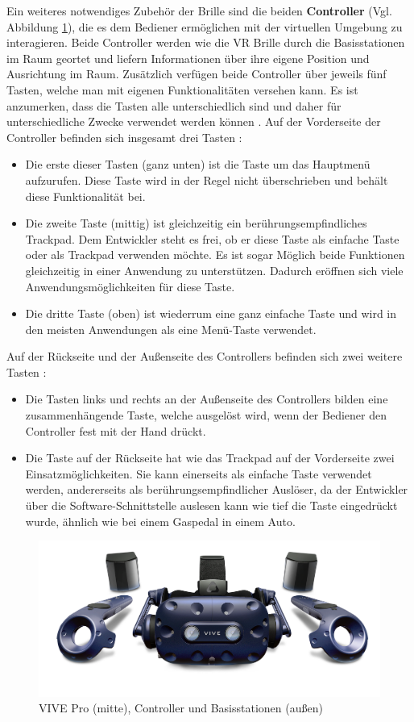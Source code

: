\newline\newline
Ein weiteres notwendiges Zubehör der Brille sind die beiden \textbf{Controller} (Vgl. Abbildung \ref{fig:ViveproKit}), die es dem Bediener ermöglichen mit der virtuellen Umgebung zu interagieren. Beide Controller werden wie die VR Brille durch die Basisstationen im Raum geortet und liefern Informationen über ihre eigene Position und Ausrichtung im Raum. Zusätzlich verfügen beide Controller über jeweils fünf Tasten, welche man mit eigenen Funktionalitäten versehen kann. Es ist anzumerken, dass die Tasten alle unterschiedlich sind und daher für unterschiedliche Zwecke verwendet werden können \cite{29}.
\newline
Auf der Vorderseite der Controller befinden sich insgesamt drei Tasten \cite{29}:
\begin{itemize}
	\item Die erste dieser Tasten (ganz unten) ist die Taste um das Hauptmenü aufzurufen. Diese 
	Taste wird in der Regel nicht überschrieben und behält diese Funktionalität bei.
	\item Die zweite Taste (mittig) ist gleichzeitig ein berührungsempfindliches Trackpad. Dem 
	Entwickler steht es frei, ob er diese Taste als einfache Taste oder als Trackpad verwenden 
	möchte. Es ist sogar Möglich beide Funktionen gleichzeitig in einer Anwendung zu 
	unterstützen. Dadurch eröffnen sich viele Anwendungsmöglichkeiten für diese Taste.
	\item Die dritte Taste (oben) ist wiederrum eine ganz einfache Taste und wird in den meisten 
	Anwendungen als eine Menü-Taste verwendet.
\end{itemize}
Auf der Rückseite und der Außenseite des Controllers befinden sich zwei weitere Tasten \cite{29}:
\begin{itemize}
	\item Die Tasten links und rechts an der Außenseite des Controllers bilden eine zusammenhängende Taste, welche ausgelöst wird, wenn der Bediener den Controller fest mit der Hand drückt.
	\item Die Taste auf der Rückseite hat wie das Trackpad auf der Vorderseite zwei 
	Einsatzmöglichkeiten. Sie kann einerseits als einfache Taste verwendet werden, andererseits 
	als berührungsempfindlicher Auslöser, da der Entwickler über die Software-Schnittstelle 
	auslesen kann wie tief die Taste eingedrückt wurde, ähnlich wie bei einem Gaspedal in
	einem Auto.
\end{itemize}
\begin{figure}[h]
	\centering
	\includegraphics[width=0.7\linewidth]{Bilder/A26_Vivepro}
	\caption{VIVE Pro (mitte), Controller und Basisstationen (außen) \cite{A26}}
	\label{fig:ViveproKit}
\end{figure}
